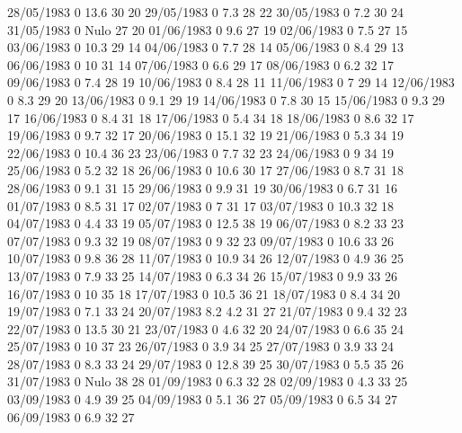 28/05/1983  0      13.6   30     20 
29/05/1983  0      7.3    28     22 
30/05/1983  0      7.2    30     24 
31/05/1983  0     Nulo    27     20 
01/06/1983  0      9.6    27     19 
02/06/1983  0      7.5    27     15 
03/06/1983  0      10.3   29     14 
04/06/1983  0      7.7    28     14 
05/06/1983  0      8.4    29     13 
06/06/1983  0      10     31     14 
07/06/1983  0      6.6    29     17 
08/06/1983  0      6.2    32     17 
09/06/1983  0      7.4    28     19 
10/06/1983  0      8.4    28     11 
11/06/1983  0      7      29     14 
12/06/1983  0      8.3    29     20 
13/06/1983  0      9.1    29     19 
14/06/1983  0      7.8    30     15 
15/06/1983  0      9.3    29     17 
16/06/1983  0      8.4    31     18 
17/06/1983  0      5.4    34     18 
18/06/1983  0      8.6    32     17 
19/06/1983  0      9.7    32     17 
20/06/1983  0      15.1   32     19 
21/06/1983  0      5.3    34     19 
22/06/1983  0      10.4   36     23 
23/06/1983  0      7.7    32     23 
24/06/1983  0      9      34     19 
25/06/1983  0      5.2    32     18 
26/06/1983  0      10.6   30     17 
27/06/1983  0      8.7    31     18 
28/06/1983  0      9.1    31     15 
29/06/1983  0      9.9    31     19 
30/06/1983  0      6.7    31     16 
01/07/1983  0      8.5    31     17 
02/07/1983  0      7      31     17 
03/07/1983  0      10.3   32     18 
04/07/1983  0      4.4    33     19 
05/07/1983  0      12.5   38     19 
06/07/1983  0      8.2    33     23 
07/07/1983  0      9.3    32     19 
08/07/1983  0      9      32     23 
09/07/1983  0      10.6   33     26 
10/07/1983  0      9.8    36     28 
11/07/1983  0      10.9   34     26 
12/07/1983  0      4.9    36     25 
13/07/1983  0      7.9    33     25 
14/07/1983  0      6.3    34     26 
15/07/1983  0      9.9    33     26 
16/07/1983  0      10     35     18 
17/07/1983  0      10.5   36     21 
18/07/1983  0      8.4    34     20 
19/07/1983  0      7.1    33     24 
20/07/1983  8.2    4.2    31     27 
21/07/1983  0      9.4    32     23 
22/07/1983  0      13.5   30     21 
23/07/1983  0      4.6    32     20 
24/07/1983  0      6.6    35     24 
25/07/1983  0      10     37     23 
26/07/1983  0      3.9    34     25 
27/07/1983  0      3.9    33     24 
28/07/1983  0      8.3    33     24 
29/07/1983  0      12.8   39     25 
30/07/1983  0      5.5    35     26 
31/07/1983  0     Nulo    38     28 
01/09/1983  0      6.3    32     28 
02/09/1983  0      4.3    33     25 
03/09/1983  0      4.9    39     25 
04/09/1983  0      5.1    36     27 
05/09/1983  0      6.5    34     27 
06/09/1983  0      6.9    32     27 
